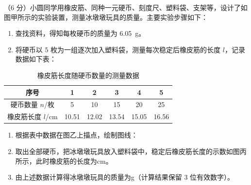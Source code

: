 \begin{question}
（6 分）小圆同学用橡皮筋、同种一元硬币、刻度尺、塑料袋、支架等，设计了如图甲所示的实验装置，测量冰墩墩玩具的质量。主要实验步骤如下：


\begin{enumerate}[leftmargin=2em, label=(\arabic*)]
  \item 查找资料，得知每枚硬币的质量为 \SI{6.05}{\gram}。
  \item 将硬币以 5 枚为一组逐次加入塑料袋，测量每次稳定后橡皮筋的长度 $l$，记录数据如下表：
\end{enumerate}

\begin{table}[htbp]
\centering
\caption{橡皮筋长度随硬币数量的测量数据}
\small
\begin{tabular}{cccccc}
\toprule
序号 & 1 & 2 & 3 & 4 & 5\\
\midrule
硬币数量 $n$/枚 & 5 & 10 & 15 & 20 & 25\\
橡皮筋长度 $l$/cm & 10.51 & 12.02 & 13.54 & 15.05 & 16.56\\
\bottomrule
\end{tabular}
\end{table}

\begin{enumerate}[leftmargin=2em, label=(\arabic*), start=3]
  \item 根据表中数据在图乙上描点，绘制图线：


  \item 取出全部硬币，把冰墩墩玩具放入塑料袋中，稳定后橡皮筋长度的示数如图丙所示，此时橡皮筋的长度为\gkblank cm。


  \item 由上述数据计算得冰墩墩玩具的质量为\gkblank g（计算结果保留 3 位有效数字）。
\end{enumerate}
\end{question}


